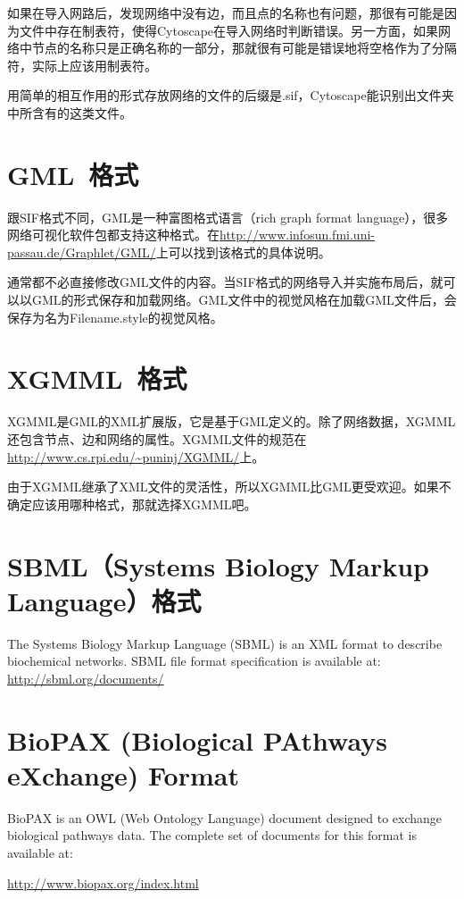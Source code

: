 如果在导入网路后，发现网络中没有边，而且点的名称也有问题，那很有可能是因为文件中存在制表符，使得Cytoscape在导入网络时判断错误。另一方面，如果网络中节点的名称只是正确名称的一部分，那就很有可能是错误地将空格作为了分隔符，实际上应该用制表符。

用简单的相互作用的形式存放网络的文件的后缀是.sif，Cytoscape能识别出文件夹中所含有的这类文件。

\section{GML~格式}
跟SIF格式不同，GML是一种富图格式语言（rich graph format language），很多网络可视化软件包都支持这种格式。在\url{http://www.infosun.fmi.uni-passau.de/Graphlet/GML/}上可以找到该格式的具体说明。

通常都不必直接修改GML文件的内容。当SIF格式的网络导入并实施布局后，就可以以GML的形式保存和加载网络。GML文件中的视觉风格在加载GML文件后，会保存为名为Filename.style的视觉风格。

\section{XGMML~格式}
XGMML是GML的XML扩展版，它是基于GML定义的。除了网络数据，XGMML还包含节点、边和网络的属性。XGMML文件的规范在\url{http://www.cs.rpi.edu/~puninj/XGMML/}上。

由于XGMML继承了XML文件的灵活性，所以XGMML比GML更受欢迎。如果不确定应该用哪种格式，那就选择XGMML吧。

\section{SBML（Systems Biology Markup Language）格式}
The Systems Biology Markup Language (SBML) is an XML format to describe biochemical networks. SBML file format specification is available at: \url{http://sbml.org/documents/}


 
\section{BioPAX (Biological PAthways eXchange) Format}


 BioPAX is an OWL (Web Ontology Language) document designed to exchange biological pathways data. The complete set of documents for this format is available at: 


 \url{http://www.biopax.org/index.html}


